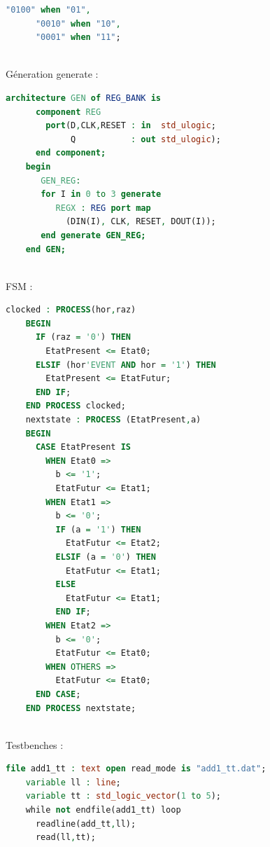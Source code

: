 \documentclass[10pt]{article}
\begin{document}
\begin{multicols}{2}
\begin{minipage}[t]{8cm}
\begin{lstlisting}[language=VHDL]
      "0100" when "01",
      "0010" when "10",
      "0001" when "11";
    \end{lstlisting}
  \end{minipage}\\
  Géneration generate :\\
  \begin{minipage}[t]{8cm}
    \begin{lstlisting}[language=VHDL]
    architecture GEN of REG_BANK is
      component REG
        port(D,CLK,RESET : in  std_ulogic;
             Q           : out std_ulogic);
      end component;
    begin
       GEN_REG:
       for I in 0 to 3 generate
          REGX : REG port map
            (DIN(I), CLK, RESET, DOUT(I));
       end generate GEN_REG;
    end GEN;
    \end{lstlisting}
  \end{minipage}\\
  \newpage
  FSM :\\
  \begin{minipage}[t]{8cm}
    \begin{lstlisting}[language=VHDL]
    clocked : PROCESS(hor,raz)
    BEGIN
      IF (raz = '0') THEN
        EtatPresent <= Etat0;
      ELSIF (hor'EVENT AND hor = '1') THEN
        EtatPresent <= EtatFutur;
      END IF;
    END PROCESS clocked;
    nextstate : PROCESS (EtatPresent,a)
    BEGIN
      CASE EtatPresent IS
        WHEN Etat0 =>
          b <= '1';
          EtatFutur <= Etat1;
        WHEN Etat1 =>
          b <= '0';
          IF (a = '1') THEN
            EtatFutur <= Etat2;
          ELSIF (a = '0') THEN
            EtatFutur <= Etat1;
          ELSE
            EtatFutur <= Etat1;
          END IF;
        WHEN Etat2 =>
          b <= '0';
          EtatFutur <= Etat0;
        WHEN OTHERS =>
          EtatFutur <= Etat0;
      END CASE;
    END PROCESS nextstate;
    \end{lstlisting}
  \end{minipage}\\
  Testbenches :\\
  \begin{minipage}[t]{8cm}
    \begin{lstlisting}[language=VHDL]
    file add1_tt : text open read_mode is "add1_tt.dat";
    variable ll : line;
    variable tt : std_logic_vector(1 to 5);
    while not endfile(add1_tt) loop
      readline(add_tt,ll);
      read(ll,tt);
    \end{lstlisting}
  \end{minipage}\\

\end{multicols}
\end{document}
